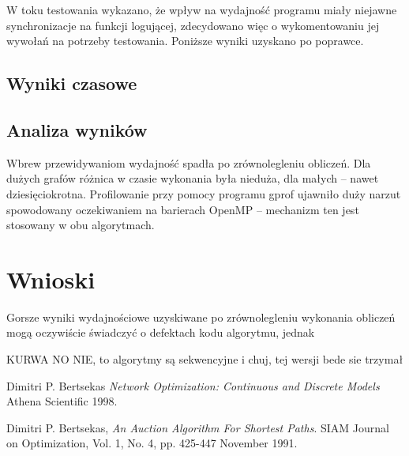 \documentclass {article}
\begin{document}
W toku testowania wykazano, że wpływ na wydajność programu miały niejawne synchronizacje na funkcji logującej, zdecydowano więc o wykomentowaniu jej wywołań na potrzeby testowania. Poniższe wyniki uzyskano po poprawce.

\subsection{Wyniki czasowe}



\subsection{Analiza wyników}

Wbrew przewidywaniom wydajność spadła po zrównolegleniu obliczeń. Dla dużych grafów różnica w czasie wykonania była nieduża, dla małych -- nawet dziesięciokrotna. Profilowanie przy pomocy programu gprof ujawniło duży narzut spowodowany oczekiwaniem na barierach OpenMP -- mechanizm ten jest stosowany w obu algorytmach.

\section{Wnioski}

Gorsze wyniki wydajnościowe uzyskiwane po zrównolegleniu wykonania obliczeń mogą oczywiście świadczyć o defektach kodu algorytmu, jednak 


KURWA NO NIE, to algorytmy są sekwencyjne i chuj, tej wersji bede sie trzymał

\begin{thebibliography}{9}

        Dimitri P. Bertsekas
        \emph{Network Optimization: Continuous and Discrete Models}
        Athena Scientific
        1998.

        Dimitri P. Bertsekas,
        \emph{An Auction Algorithm For Shortest Paths}.
        SIAM Journal on Optimization,
        Vol. 1, No. 4, pp. 425-447
        November 1991.
      
\end{thebibliography}
\end{document}
